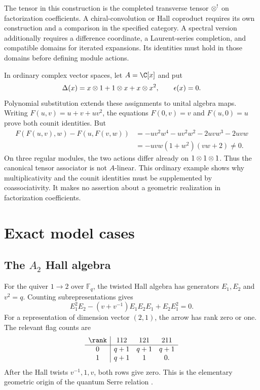 The tensor in this construction is the completed transverse tensor
$\mathbin{\otimes}^!$ on factorization coefficients.
A chiral-convolution or Hall coproduct requires its own construction
and a comparison in the specified category.
A spectral version additionally requires a difference coordinate,
a Laurent-series completion, and compatible domains for iterated expansions.
Its identities must hold in those domains before defining module actions.

\begin{example}
In ordinary complex vector spaces, let $A=\C[x]$ and put
\[
 \Delta(x)=x\mathbin{\otimes}1+1\mathbin{\otimes} x+x\mathbin{\otimes} x^2,
 \qquad \epsilon(x)=0.
\]
Polynomial substitution extends these assignments to unital algebra maps.
Writing $F(u,v)=u+v+uv^2$, the equations
$F(0,v)=v$ and $F(u,0)=u$ prove both counit identities.
But
\[
\begin{split}
 F(F(u,v),w)-F(u,F(v,w))
 &=-uv^2w^4-uv^2w^2-2uvw^3-2uvw\\
 &=-uvw(1+w^2)(vw+2)\ne0.
\end{split}
\]
On three regular modules, the two actions differ already on
$1\mathbin{\otimes}1\mathbin{\otimes}1$.
Thus the canonical tensor associator is not $A$-linear.
This ordinary example shows why multiplicativity and the counit identities
must be supplemented by coassociativity.
It makes no assertion about a geometric realization in factorization coefficients.
\end{example}

\part{Exact model cases}

\chapter{The \texorpdfstring{$A_2$}{A2} Hall algebra}
For the quiver $1\to2$ over $\mathbb F_q$, the twisted Hall algebra has generators $E_1,E_2$ and $v^2=q$. Counting subrepresentations gives
\[
 E_1^2E_2-(v+v^{-1})E_1E_2E_1+E_2E_1^2=0.
\]
For a representation of dimension vector $(2,1)$, the arrow has rank zero or one. The relevant flag counts are
\[
\begin{array}{c|ccc}
\rank&112&121&211\\ \hline
0&q+1&q+1&q+1\\
1&q+1&1&0.
\end{array}
\]
After the Hall twists $v^{-1},1,v$, both rows give zero. This is the elementary geometric origin of the quantum Serre relation \cite{Ringel,Green}.

